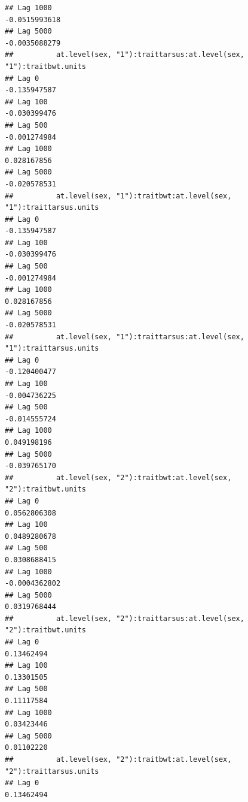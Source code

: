 \documentclass[
  12pt,
]{book}
\begin{document}
\begin{verbatim}
## Lag 1000                                                 -0.0515993618
## Lag 5000                                                 -0.0035088279
##          at.level(sex, "1"):traittarsus:at.level(sex, "1"):traitbwt.units
## Lag 0                                                        -0.135947587
## Lag 100                                                      -0.030399476
## Lag 500                                                      -0.001274984
## Lag 1000                                                      0.028167856
## Lag 5000                                                     -0.020578531
##          at.level(sex, "1"):traitbwt:at.level(sex, "1"):traittarsus.units
## Lag 0                                                        -0.135947587
## Lag 100                                                      -0.030399476
## Lag 500                                                      -0.001274984
## Lag 1000                                                      0.028167856
## Lag 5000                                                     -0.020578531
##          at.level(sex, "1"):traittarsus:at.level(sex, "1"):traittarsus.units
## Lag 0                                                           -0.120400477
## Lag 100                                                         -0.004736225
## Lag 500                                                         -0.014555724
## Lag 1000                                                         0.049198196
## Lag 5000                                                        -0.039765170
##          at.level(sex, "2"):traitbwt:at.level(sex, "2"):traitbwt.units
## Lag 0                                                     0.0562806308
## Lag 100                                                   0.0489280678
## Lag 500                                                   0.0308688415
## Lag 1000                                                 -0.0004362802
## Lag 5000                                                  0.0319768444
##          at.level(sex, "2"):traittarsus:at.level(sex, "2"):traitbwt.units
## Lag 0                                                          0.13462494
## Lag 100                                                        0.13301505
## Lag 500                                                        0.11117584
## Lag 1000                                                       0.03423446
## Lag 5000                                                       0.01102220
##          at.level(sex, "2"):traitbwt:at.level(sex, "2"):traittarsus.units
## Lag 0                                                          0.13462494

\end{verbatim}
\end{document}
